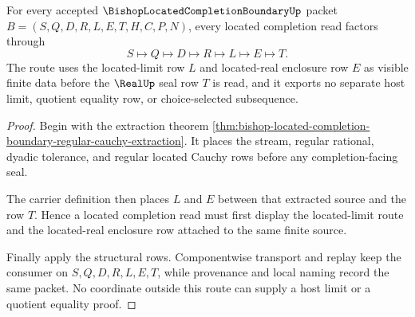 \begin{theorem}
\label{thm:bishop-located-completion-boundary-located-limit-route}
For every accepted $\BishopLocatedCompletionBoundaryUp$ packet $B=(S,Q,D,R,L,E,T,H,C,P,N)$, every located completion read factors through
$$
S\longmapsto Q\longmapsto D\longmapsto R\longmapsto L\longmapsto E\longmapsto T .
$$
The route uses the located-limit row $L$ and located-real enclosure row $E$ as visible finite data before the $\RealUp$ seal row $T$ is read, and it exports no separate host limit, quotient equality row, or choice-selected subsequence.
\end{theorem}
\begin{proof}
Begin with the extraction theorem \autoref{thm:bishop-located-completion-boundary-regular-cauchy-extraction}. It places the stream, regular rational, dyadic tolerance, and regular located Cauchy rows before any completion-facing seal.

The carrier definition then places $L$ and $E$ between that extracted source and the row $T$. Hence a located completion read must first display the located-limit route and the located-real enclosure row attached to the same finite source.

Finally apply the structural rows. Componentwise transport and replay keep the consumer on $S,Q,D,R,L,E,T$, while provenance and local naming record the same packet. No coordinate outside this route can supply a host limit or a quotient equality proof.
\end{proof}

